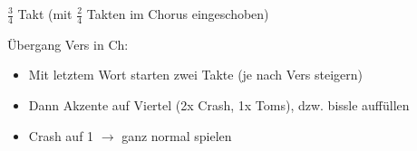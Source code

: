 
$\frac{3}{4}$ Takt (mit $\frac{2}{4}$ Takten im Chorus eingeschoben)

Übergang Vers in Ch:
\begin{itemize}
	\item Mit letztem Wort starten zwei Takte (je nach Vers steigern)
	\item Dann Akzente auf Viertel (2x Crash, 1x Toms), dzw. bissle auffüllen
	\item Crash auf 1 $\rightarrow$ ganz normal spielen
\end{itemize}

